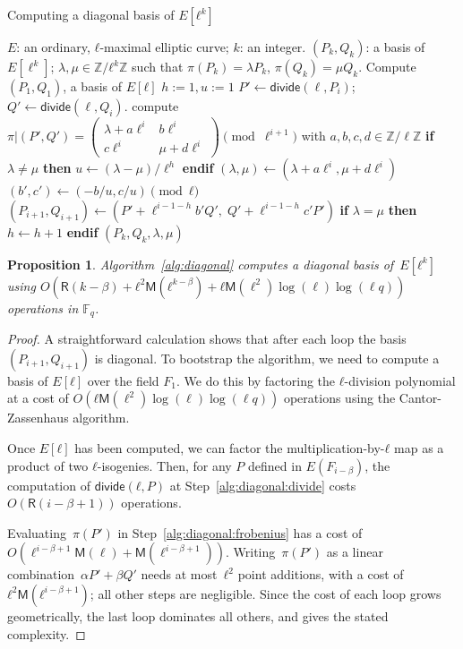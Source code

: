 \documentclass{lms}
\newtheorem{prop}[thm]{Proposition}
\def\cout#1{\mathsf{#1}}
\def\sfdiv{\mathsf{divide}}
\newcommand{\F}{\mathbb{F}}
\newcommand{\MM}{\cout{M}}
\newcommand{\RR}{\cout{R}}
\begin{document}
\begin{algorithm}
\caption{\label{alg:diagonal}Computing a diagonal basis of $E[ℓ^k]$}
\begin{algorithmic}[1]
\REQUIRE $E$: an ordinary, $ℓ$-maximal elliptic curve; $k$: an integer.
\ENSURE $(P_k, Q_k )$: a basis of $E[\ell^k]$;
$λ, μ ∈ ℤ/ℓ^k ℤ$
such that $\pi(P_k)= λ P_k$, $ \pi(Q_k)= μ Q_k$.
\STATE Compute $(P_1,Q_1)$, a basis of $E[ℓ]$
\STATE $h:=1, u:=1$
\STATE\label{alg:diagonal:divide} $P' \leftarrow \sfdiv(\ell, P_i)$; $Q' \leftarrow \sfdiv(\ell, Q_i)$.
\STATE\label{alg:diagonal:frobenius} compute $\pi|(P',Q')=\left( \begin{smallmatrix}
λ + a\ell^{i} & b\ell^{i}\\
c\ell^{i} & μ + d\ell^{i}
\end{smallmatrix}
\right) \pmod {\ell^{i+1}}$
with $a,b,c,d \in \mathbb{Z}/\ell\mathbb{Z}$
\STATE \textbf{if} {$λ \neq μ$} \textbf{then}
$u \leftarrow (λ -μ)/\ell^h$ \textbf{endif}
\STATE $(λ, μ) \gets
  (λ + a\ell^i, μ + d\ell^i)$
\STATE $(b',c') \gets (-b/u , c/u) \pmod{ℓ}$
\STATE $(P_{i+1},Q_{i+1}) \gets
  (P'+\ell^{i-1-h}b' Q',\;Q'+\ell^{i-1-h}c' P')$
\STATE \textbf{if} {$λ = μ$} \textbf{then} $h \leftarrow h+1$ \textbf{endif}
\ENDFOR
\RETURN $(P_{k},Q_{k},λ,μ)$
\end{algorithmic}
\end{algorithm}
\begin{prop}\label{th:diagonal}
  Algorithm~\ref{alg:diagonal} computes a diagonal basis of~$E[ℓ^k]$
  using
  $O(\RR(k-\beta) + ℓ^2\MM(ℓ^{k-β}) + ℓ\MM(\ell^2)\log(\ell)\log(\ell
  q))$ operations in $\F_q$.
\end{prop}
\begin{proof}
  A straightforward calculation shows that after each loop the basis
  $(P_{i+1},Q_{i+1})$ is diagonal.
  To bootstrap the algorithm, we need to compute a basis of $E[ℓ]$
  over the field $F_1$. We do this by factoring the $ℓ$-division
  polynomial at a cost of $O(ℓ\MM(\ell^2)\log(\ell)\log(\ell q))$
  operations using the Cantor-Zassenhaus algorithm.

  Once $E[ℓ]$ has been computed, we can factor the
  multiplication-by-$ℓ$ map as a product of two $ℓ$-isogenies. Then,
  for any $P$ defined in $E(F_{i-β})$, the computation of
  $\sfdiv(ℓ, P)$ at Step~\ref{alg:diagonal:divide} costs $O(\RR(i-β+1))$
  operations.

  Evaluating~$π(P')$ in Step~\ref{alg:diagonal:frobenius} has a cost
  of~$O(\ell^{i-\beta+1}\MM(\ell)+\MM(\ell^{i-\beta+1}))$.
  Writing~$π(P')$ as a linear combination~$α P' + β Q'$ needs at
  most~$ℓ^2$ point additions, with a cost of~$ℓ^2
  \mathsf{M}(ℓ^{i-\beta+1})$; all other steps are negligible.  Since
  the cost of each loop grows geometrically, the last loop dominates
  all others, and gives the stated complexity.
\end{proof}
\end{document}
